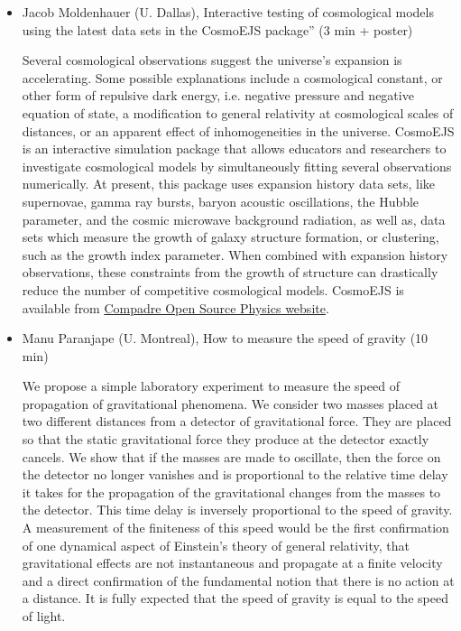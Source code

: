 \documentclass[letterpaper,12pt]{article}
\newcommand{\talk}[2]{{\fontspec{Lato Bold} #1,} {\fontspec{Lato Light Italic} #2}}
\begin{document}
\begin{itemize}
\item \talk{Jacob Moldenhauer (U. Dallas)}{Interactive testing of cosmological models using the latest data sets in the CosmoEJS package” (3 min + poster)}

Several cosmological observations suggest the universe’s expansion is accelerating. Some possible explanations include a cosmological constant, or other form of repulsive dark energy, i.e. negative pressure and negative equation of state, a modification to general relativity at cosmological scales of distances, or an apparent effect of inhomogeneities in the universe.  CosmoEJS is an interactive simulation package that allows educators and researchers to investigate cosmological models by simultaneously fitting several observations numerically.  At present, this package uses expansion history data sets, like supernovae, gamma ray bursts, baryon acoustic oscillations, the Hubble parameter, and the cosmic microwave background radiation, as well as, data sets which measure the growth of galaxy structure formation, or clustering, such as the growth index parameter.  When combined with expansion history observations, these constraints from the growth of structure can drastically reduce the number of competitive cosmological models. CosmoEJS is available from \href{http://www.compadre.org/osp/items/detail.cfm?ID=12406}{Compadre Open Source Physics website}.


\item \talk{Manu Paranjape (U. Montreal)}{How to measure the speed of gravity (10 min)}

We propose a simple laboratory experiment to measure the speed of propagation of gravitational phenomena. We consider two masses placed at two different distances from a detector of gravitational force. They are placed so that the static gravitational force they produce at the detector exactly cancels. We show that if the masses are made to oscillate, then the force on the detector no longer vanishes and is proportional to the relative time delay it takes for the propagation of the gravitational changes from the masses to the detector. This time delay is inversely proportional to the speed of gravity. A measurement of the finiteness of this speed would be the first confirmation of one dynamical aspect of Einstein's theory of general relativity, that gravitational effects are not instantaneous and propagate at a finite velocity and a direct confirmation of the fundamental notion that there is no action at a distance. It is fully expected that the speed of gravity is equal to the speed of light. 


\end{itemize}
\end{document}
